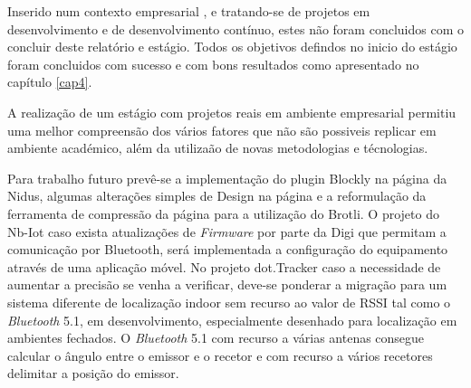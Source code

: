 \par Inserido num contexto empresarial , e tratando-se de projetos em desenvolvimento e de desenvolvimento contínuo, estes não foram concluidos com o concluir deste relatório e estágio. Todos os objetivos defindos no inicio do estágio foram concluidos com sucesso e com bons resultados como apresentado no capítulo \ref{cap4}. 
\par A realização de um estágio com projetos reais em ambiente empresarial permitiu uma melhor compreensão dos vários fatores que  não são possiveis replicar em ambiente académico, além da utilizaão de novas metodologias e técnologias.

\par Para trabalho futuro prevê-se a implementação do plugin Blockly na página da Nidus, algumas alterações simples de Design na página e a reformulação da ferramenta de compressão da página para a utilização do Brotli.
O projeto do Nb-Iot caso exista atualizações de \textit{Firmware} por parte da Digi que permitam a comunicação por Bluetooth, será implementada a configuração do equipamento através de uma aplicação móvel. No projeto dot.Tracker caso a necessidade de aumentar a precisão se venha a verificar, deve-se ponderar a migração para um sistema diferente de localização indoor sem recurso ao valor de RSSI tal como o \textit{Bluetooth} 5.1, em desenvolvimento, especialmente desenhado para localização em ambientes fechados. O \textit{Bluetooth} 5.1 com recurso a várias antenas  consegue calcular o ângulo entre o emissor e o recetor e com recurso a vários recetores delimitar a posição do emissor.